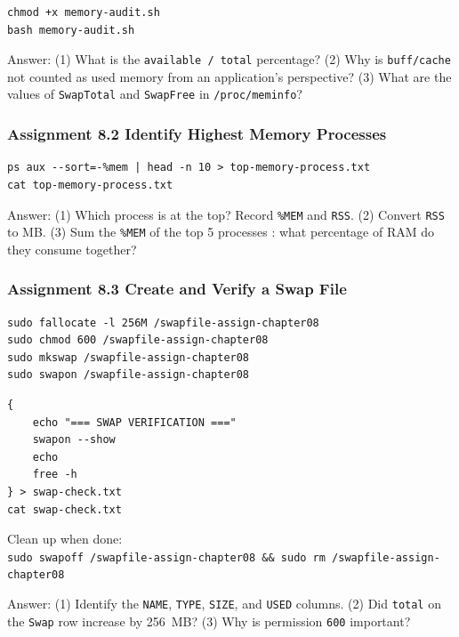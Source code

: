 \begin{lstlisting}[caption={Run the audit script}]
chmod +x memory-audit.sh
bash memory-audit.sh
\end{lstlisting}

Answer: (1) What is the \texttt{available / total} percentage? (2) Why is
\texttt{buff/cache} not counted as used memory from an application's perspective?
(3) What are the values of \texttt{SwapTotal} and \texttt{SwapFree} in
\texttt{/proc/meminfo}?

\subsubsection{Assignment 8.2 Identify Highest Memory Processes}

\begin{lstlisting}[caption={Save and display the top processes}]
ps aux --sort=-%mem | head -n 10 > top-memory-process.txt
cat top-memory-process.txt
\end{lstlisting}

Answer: (1) Which process is at the top? Record \texttt{\%MEM} and \texttt{RSS}.
(2) Convert \texttt{RSS} to MB. (3) Sum the \texttt{\%MEM} of the top 5 processes
: what percentage of RAM do they consume together?

\subsubsection{Assignment 8.3 Create and Verify a Swap File}

\begin{lstlisting}[caption={Create and activate the assignment swap file}]
sudo fallocate -l 256M /swapfile-assign-chapter08
sudo chmod 600 /swapfile-assign-chapter08
sudo mkswap /swapfile-assign-chapter08
sudo swapon /swapfile-assign-chapter08
\end{lstlisting}

\begin{lstlisting}[caption={Verify and save the result}]
{
    echo "=== SWAP VERIFICATION ==="
    swapon --show
    echo
    free -h
} > swap-check.txt
cat swap-check.txt
\end{lstlisting}

\begin{notebox}
Clean up when done:\\
\texttt{sudo swapoff /swapfile-assign-chapter08 \&\& sudo rm /swapfile-assign-chapter08}
\end{notebox}

Answer: (1) Identify the \texttt{NAME}, \texttt{TYPE}, \texttt{SIZE}, and
\texttt{USED} columns. (2) Did \texttt{total} on the \texttt{Swap} row increase
by 256~MB? (3) Why is permission \texttt{600} important?

